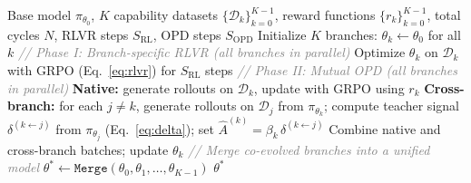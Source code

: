 \begin{algorithm}[t]
\caption{\method: \fullmethod}
\label{alg:method}
\begin{algorithmic}[1]
\Require Base model $\pi_{\theta_0}$, $K$ capability datasets $\{\mathcal{D}_k\}_{k=0}^{K-1}$, reward functions $\{r_k\}_{k=0}^{K-1}$, total cycles $N$, RLVR steps $S_{\mathrm{RL}}$, OPD steps $S_{\mathrm{OPD}}$
\State Initialize $K$ branches: $\theta_k \gets \theta_0$ for all $k$
    \State \textcolor{gray}{\textit{// Phase I: Branch-specific RLVR (all branches in parallel)}}
        \State Optimize $\theta_k$ on $\mathcal{D}_k$ with GRPO (Eq.~\ref{eq:rlvr}) for $S_{\mathrm{RL}}$ steps
    \EndFor
    \State \textcolor{gray}{\textit{// Phase II: Mutual OPD (all branches in parallel)}}
            \State \textbf{Native:} generate rollouts on $\mathcal{D}_k$, update with GRPO using $r_k$
            \State \textbf{Cross-branch:} for each $j \neq k$, generate rollouts on $\mathcal{D}_j$ from $\pi_{\theta_k}$; compute teacher signal $\delta^{(k \leftarrow j)}$ from $\pi_{{\theta}_j}$ (Eq.~\ref{eq:delta}); set $\hat{A}^{(k)} = \beta_k \, \delta^{(k \leftarrow j)}$
            \State Combine native and cross-branch batches; update $\theta_k$
        \EndFor
    \EndFor
\EndFor
\State \textcolor{gray}{\textit{// Merge co-evolved branches into a unified model}}
\State $\theta^* \gets \texttt{Merge}(\theta_0, \theta_1, \dots, \theta_{K-1})$
\State \Return $\theta^*$
\end{algorithmic}
\end{algorithm}